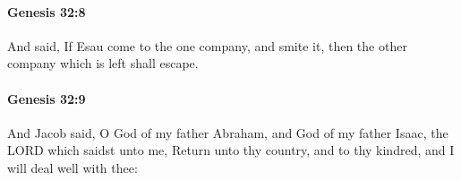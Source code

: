 		\paragraph{Genesis 32:8} %
			\label{GENESIS-32-8}

			And said, If Esau come to the one company, and smite it, then the other company which is left shall escape.


		\paragraph{Genesis 32:9} %
			\label{GENESIS-32-9}

			And Jacob said, O God of my father Abraham, and God of my father Isaac, the LORD which saidst unto me, Return unto thy country, and to thy kindred, and I will deal well with thee:


